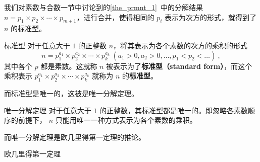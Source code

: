 
我们对素数与合数一节中讨论到的\autoref{the_prmnt_1}~中的分解结果 $n = p_1 \times p_2\times \cdots \times p_{m+1}$，进行合并，使得相同的 $p_i$ 表示为次方的形式，就得到了 $n$ 的标准型。
\begin{definition}{标准型}
对于任意大于 $1$ 的正整数 $n$，将其表示为各个素数的次方的乘积的形式
\begin{equation}
n = p_1^{a_1} \times p_2^{a_2} \times \cdots \times p_k^{a_k} ~ (a_1 > 0, a_2 > 0 , \dots, p_1 < p_2<\dots) ~,
\end{equation}
其中各个 $p$ 都是素数。这就称 $n$ 被表示为了\textbf{标准型（standard form）}，而这个乘积表示 $p_1^{a_1} \times p_2^{a_2} \times \cdots \times p_k^{a_k}$ 就称为 $n$ 的\textbf{标准型}。
\end{definition}

而标准型是唯一的，这被是唯一分解定理。
\begin{theorem}{唯一分解定理}
对于任意大于 $1$ 的正整数，其标准型都是唯一的。即忽略各素数顺序的前提下， $n$ 只能用唯一一种方式表示为各个素数的乘积。
\end{theorem}

而唯一分解定理是欧几里得第一定理的推论。
\begin{theorem}{欧几里得第一定理}

\end{theorem}